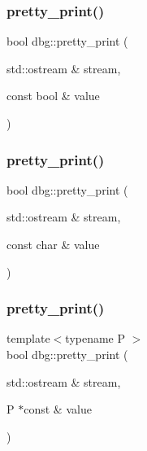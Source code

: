 \mbox{\label{namespacedbg_a4f9989bfef507d5034cc50d015654ca4}} 
\subsubsection{\texorpdfstring{pretty\+\_\+print()}{pretty\_print()}\hspace{0.1cm}{\footnotesize\ttfamily [4/19]}}
{\footnotesize\ttfamily bool dbg\+::pretty\+\_\+print (\begin{DoxyParamCaption}\item[{std\+::ostream \&}]{stream,  }\item[{const bool \&}]{value }\end{DoxyParamCaption})\hspace{0.3cm}{\ttfamily [inline]}}

\mbox{\label{namespacedbg_acc6a678f0c3954671e247468e249e5a4}} 
\subsubsection{\texorpdfstring{pretty\+\_\+print()}{pretty\_print()}\hspace{0.1cm}{\footnotesize\ttfamily [5/19]}}
{\footnotesize\ttfamily bool dbg\+::pretty\+\_\+print (\begin{DoxyParamCaption}\item[{std\+::ostream \&}]{stream,  }\item[{const char \&}]{value }\end{DoxyParamCaption})\hspace{0.3cm}{\ttfamily [inline]}}

\mbox{\label{namespacedbg_a2194ca6a2105fd8c57e5cb43f688d240}} 
\subsubsection{\texorpdfstring{pretty\+\_\+print()}{pretty\_print()}\hspace{0.1cm}{\footnotesize\ttfamily [6/19]}}
{\footnotesize\ttfamily template$<$typename P $>$ \\
bool dbg\+::pretty\+\_\+print (\begin{DoxyParamCaption}\item[{std\+::ostream \&}]{stream,  }\item[{P $\ast$const \&}]{value }\end{DoxyParamCaption})\hspace{0.3cm}{\ttfamily [inline]}}


